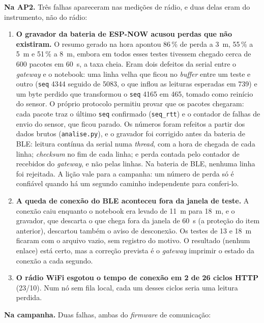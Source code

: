 \noindent\textbf{Na AP2.} Três falhas apareceram nas medições de rádio,
e duas delas eram do instrumento, não do rádio:

\begin{enumerate}
  \item \textbf{O gravador da bateria de ESP-NOW acusou perdas que não
    existiram.} O resumo gerado na hora apontou 86\,\% de perda a
    \SI{3}{\metre}, 55\,\% a \SI{5}{\metre} e 51\,\% a \SI{8}{\metre},
    embora em todos esses testes tivessem chegado cerca de 600 pacotes em
    \SI{60}{\second}, a taxa cheia. Eram dois defeitos da serial entre o
    \emph{gateway} e o notebook: uma linha velha que ficou no
    \emph{buffer} entre um teste e outro (\texttt{seq} 4344 seguido de
    5083, o que inflou as leituras esperadas em 739) e um byte perdido
    que transformou o \texttt{seq} 4165 em 465, tomado como reinício do
    sensor. O próprio protocolo permitiu provar que os pacotes chegaram:
    cada pacote traz o último \texttt{seq} confirmado (\texttt{seq\_rtt})
    e o contador de falhas de envio do sensor, que ficou parado. Os
    números foram refeitos a partir dos dados brutos (\texttt{analise.py}),
    e o gravador foi corrigido antes da bateria de BLE: leitura contínua
    da serial numa \emph{thread}, com a hora de chegada de cada linha;
    \emph{checksum} no fim de cada linha; e perda contada pelo contador
    de recebidos do \emph{gateway}, e não pelas linhas. Na bateria de
    BLE, nenhuma linha foi rejeitada. A lição vale para a campanha: um
    número de perda só é confiável quando há um segundo caminho
    independente para conferi-lo.
  \item \textbf{A queda de conexão do BLE aconteceu fora da janela de
    teste.} A conexão caiu enquanto o notebook era levado de \SI{11}{\metre}
    para \SI{18}{\metre}, e o gravador, que descarta o que chega fora da
    janela de \SI{60}{\second} (a proteção do item anterior), descartou
    também o aviso de desconexão. Os testes de 13 e \SI{18}{\metre}
    ficaram com o arquivo vazio, sem registro do motivo. O resultado
    (nenhum enlace) está certo, mas a correção prevista é o
    \emph{gateway} imprimir o estado da conexão a cada segundo.
  \item \textbf{O rádio WiFi esgotou o tempo de conexão em 2 de 26
    ciclos HTTP} (23/10). Num nó
    sem fila local, cada um desses ciclos seria uma leitura perdida.
\end{enumerate}

\noindent\textbf{Na campanha.} Duas falhas, ambas do \emph{firmware} de
comunicação:

